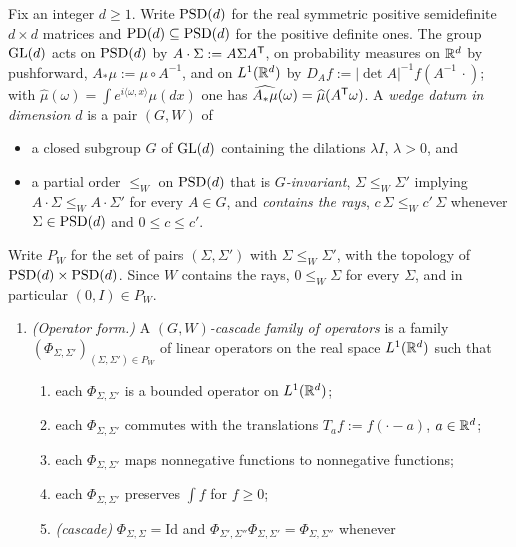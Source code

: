 \begin{definition}\label{def:gw-cascade-family}
Fix an integer $d \ge 1$. Write $\mathrm{PSD}(d)$ for the real symmetric positive semidefinite
$d \times d$ matrices and $\mathrm{PD}(d) \subseteq \mathrm{PSD}(d)$ for the positive definite ones. The group
$\mathrm{GL}(d)$ acts on $\mathrm{PSD}(d)$ by $A \cdot \Sigma := A\Sigma A^{\mathsf{T}}$, on probability measures on
$\mathbb{R}^d$ by pushforward, $A_*\mu := \mu \circ A^{-1}$, and on $L^1(\mathbb{R}^d)$ by
$D_Af := |\det A|^{-1}f(A^{-1}\,\cdot)$; with
$\widehat\mu(\omega) = \int e^{i\langle\omega,x\rangle}\mu(dx)$ one has
$\widehat{A_*\mu}(\omega) = \widehat\mu(A^{\mathsf{T}}\omega)$. A \emph{wedge datum in dimension $d$} is a
pair $(G, W)$ of
\begin{itemize}
\item a closed subgroup $G$ of $\mathrm{GL}(d)$ containing the dilations $\lambda I$, $\lambda > 0$, and
\item a partial order $\le_W$ on $\mathrm{PSD}(d)$ that is \emph{$G$-invariant}, $\Sigma \le_W \Sigma'$
implying $A \cdot \Sigma \le_W A \cdot \Sigma'$ for every $A \in G$, and \emph{contains the rays},
$c\,\Sigma \le_W c'\,\Sigma$ whenever $\Sigma \in \mathrm{PSD}(d)$ and $0 \le c \le c'$.
\end{itemize}
Write $P_W$ for the set of pairs $(\Sigma, \Sigma')$ with $\Sigma \le_W \Sigma'$, with the topology
of $\mathrm{PSD}(d) \times \mathrm{PSD}(d)$. Since $W$ contains the rays, $0 \le_W \Sigma$ for every $\Sigma$, and
in particular $(0, I) \in P_W$.
\begin{enumerate}
\item \emph{(Operator form.)} A \emph{$(G, W)$-cascade family of operators} is a family
$(\Phi_{\Sigma,\Sigma'})_{(\Sigma,\Sigma') \in P_W}$ of linear operators on the real space
$L^1(\mathbb{R}^d)$ such that
\begin{enumerate}
\item[(A1)] each $\Phi_{\Sigma,\Sigma'}$ is a bounded operator on $L^1(\mathbb{R}^d)$;
\item[(A2)] each $\Phi_{\Sigma,\Sigma'}$ commutes with the translations $T_af := f(\cdot - a)$,
$a \in \mathbb{R}^d$;
\item[(A4)] each $\Phi_{\Sigma,\Sigma'}$ maps nonnegative functions to nonnegative functions;
\item[(A5)] each $\Phi_{\Sigma,\Sigma'}$ preserves $\int f$ for $f \ge 0$;
\item[(A6)] \emph{(cascade)} $\Phi_{\Sigma,\Sigma} = \mathrm{Id}$ and
$\Phi_{\Sigma',\Sigma''}\Phi_{\Sigma,\Sigma'} = \Phi_{\Sigma,\Sigma''}$ whenever

\end{enumerate}
\end{enumerate}
\end{definition}
